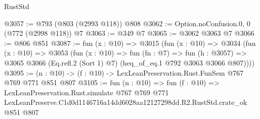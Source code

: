 \begin{lexlean}{RustStd}
\begin{coremodule}
@3057 := @793 (@803 (@2993 @118)) @808
@3062 := Option.noConfusion.{0, 0} (@772 (@2998 @118)) @7
@3063 := @349 @7
@3065 := @3062 @3063 @7
@3066 := @806 @851
@3087 := fun (x : @10) =>
  @3015
    (fun (x : @10) =>
    @3034
      (fun (x : @10) =>
      @3053
        (fun (x : @10) =>
        fun (fn : @7) =>
        fun (h : @3057) =>
        @3065 @3066 (Eq.refl.{2} (Sort 1) @7) (heq_of_eq.{1} @792 @3063 @3066 @807))))
@3095 := (n : @10) -> (f : @10) -> LexLeanPreservation.Rust.FunSem @767 @769 @771 @851 @807
@3105 := fun (n : @10) =>
  fun (f : @10) =>
  LexLeanPreservation.Rust.simulate
    @767
    @769
    @771
    LexLeanPreserve.C1d0d1146716a14dd6028aa12127298dd.R2.RustStd.crate_ok
    @851
    @807
\end{coremodule}
\end{lexlean}
